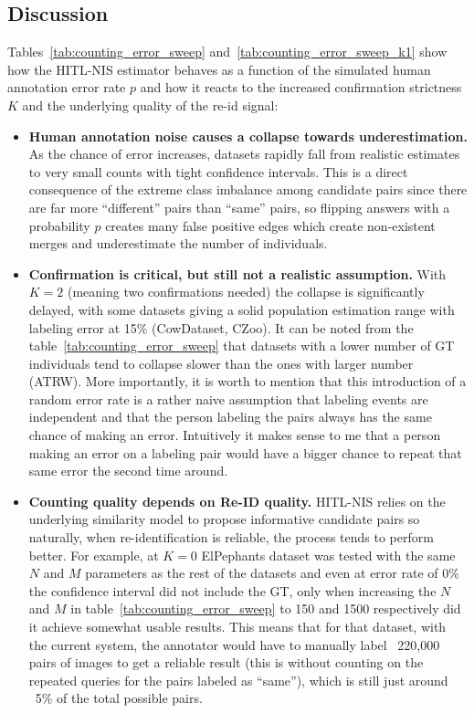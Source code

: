 \subsection{Discussion}
Tables~\ref{tab:counting_error_sweep} and~\ref{tab:counting_error_sweep_k1} show how the HITL-NIS estimator behaves as a function of the simulated human annotation error rate \(p\) and how it reacts to the increased confirmation strictness \(K\) and the underlying quality of the re-id signal:
\begin{itemize}
    \item \textbf{Human annotation noise causes a collapse towards underestimation.} As the chance of error increases, datasets rapidly fall from realistic estimates to very small counts with tight confidence intervals. This is a direct consequence of the extreme class imbalance among candidate pairs since there are far more ``different'' pairs than ``same'' pairs, so flipping answers with a probability \(p\) creates many false positive edges which create non-existent merges and underestimate the number of individuals.
    \item \textbf{Confirmation is critical, but still not a realistic assumption.} With \(K=2\) (meaning two confirmations needed) the collapse is significantly delayed, with some datasets giving a solid population estimation range with labeling error at 15\% (CowDataset, CZoo). It can be noted from the table~\ref{tab:counting_error_sweep} that datasets with a lower number of GT individuals tend to collapse slower than the ones with larger number (ATRW). More importantly, it is worth to mention that this introduction of a random error rate is a rather naive assumption that labeling events are independent and that the person labeling the pairs always has the same chance of making an error. Intuitively it makes sense to me that a person making an error on a labeling pair would have a bigger chance to repeat that same error the second time around. 
    \item \textbf{Counting quality depends on Re-ID quality.} HITL-NIS relies on the underlying similarity model to propose informative candidate pairs so naturally, when re-identification is reliable, the process tends to perform better. For example, at \(K = 0\) ElPephants dataset was tested with the same \(N\) and \(M\) parameters as the rest of the datasets and even at error rate of 0\% the confidence interval did not include the GT, only when increasing the \(N\) and \(M\) in table~\ref{tab:counting_error_sweep} to 150 and 1500 respectively did it achieve somewhat usable results. This means that for that dataset, with the current system, the annotator would have to manually label ~220,000 pairs of images to get a reliable result (this is without counting on the repeated queries for the pairs labeled as ``same''), which is still just around ~5\% of the total possible pairs. 
\end{itemize}
